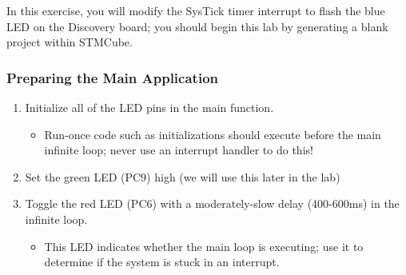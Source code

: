 \documentclass[11pt,fleqn]{book} %
\begin{document}
\begin{exercise}
    \label{ex1}
    In this exercise, you will modify the SysTick timer interrupt to flash the blue LED on the Discovery board; you should begin this lab by generating a blank project within STMCube.
    
   \subsubsection{Preparing the Main Application}
   \begin{enumerate}
       \item Initialize all of the LED pins in the main function.
       \begin{itemize}
           \item Run-once code such as initializations should execute before the main infinite loop; never use an interrupt handler to do this!
       \end{itemize}
       \item Set the green LED (PC9) high (we will use this later in the lab)
       \item Toggle the red LED (PC6) with a moderately-slow delay (400-600ms) in the infinite loop.
       \begin{itemize}
           \item This LED indicates whether the main loop is executing; use it to determine if the system is stuck in an interrupt.
       \end{itemize} 
   \end{enumerate}

\end{exercise}
\end{document}
